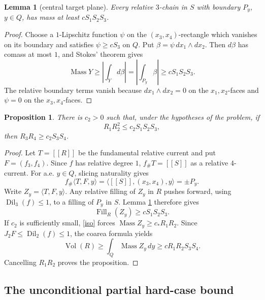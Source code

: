 \documentclass[12pt]{article}
\newtheorem{lemma}{Lemma}
\newtheorem{proposition}{Proposition}
\newcommand{\Dil}{\operatorname{Dil}}
\newcommand{\Vol}{\operatorname{Vol}}
\newcommand{\Mass}{\operatorname{Mass}}
\newcommand{\Fill}{\operatorname{Fill}}
\begin{document}
\begin{lemma}[central target plane]\label{central}
Every relative \(3\)-chain in \(S\) with boundary \(P_y\), \(y\in Q\), has
mass at least \(cS_1S_2S_3\).
\end{lemma}

\begin{proof}
Choose a \(1\)-Lipschitz function \(\psi\) on the
\((x_3,x_4)\)-rectangle which vanishes on its boundary and satisfies
\(\psi\ge cS_3\) on \(Q\).  Put \(\beta=\psi\,dx_1\wedge dx_2\).  Then
\(d\beta\) has comass at most \(1\), and Stokes' theorem gives
\[
\Mass Y\ge\left|\int_Yd\beta\right|
 =\left|\int_{P_y}\beta\right|\ge cS_1S_2S_3 .
\]
The relative boundary terms vanish because \(dx_1\wedge dx_2=0\) on the
\(x_1,x_2\)-faces and \(\psi=0\) on the \(x_3,x_4\)-faces.
\end{proof}

\begin{proposition}\label{firstalt}
There is \(c_2>0\) such that, under the hypotheses of the problem, if
\[
        R_1R_2^2\le c_2S_1S_2S_3 ,
\]
then \(R_3R_4\ge c_2S_3S_4\).
\end{proposition}

\begin{proof}
Let \(T=[[R]]\) be the fundamental relative current and put \(F=(f_3,f_4)\).
Since \(f\) has relative degree \(1\), \(f_\#T=[[S]]\) as a relative
\(4\)-current.  For a.e. \(y\in Q\), slicing naturality gives
\[
        f_\#\langle T,F,y\rangle
        =\langle [[S]],(x_3,x_4),y\rangle=\pm P_y .
\]
Write \(Z_y=\langle T,F,y\rangle\).  Any relative filling of \(Z_y\) in \(R\)
pushes forward, using \(\Dil_3(f)\le1\), to a filling of \(P_y\) in \(S\).
Lemma \ref{central} therefore gives
\[
        \Fill_R(Z_y)\ge cS_1S_2S_3 .
\]
If \(c_2\) is sufficiently small, \eqref{iso} forces
\(\Mass Z_y\ge c_*R_1R_2\).  Since \(J_2F\le\Dil_2(f)\le1\), the coarea
formula yields
\[
 \Vol(R)\ge\int_Q\Mass Z_y\,dy
        \ge cR_1R_2S_3S_4 .
\]
Cancelling \(R_1R_2\) proves the proposition.
\end{proof}

\subsection*{The unconditional partial hard-case bound}
\end{document}
